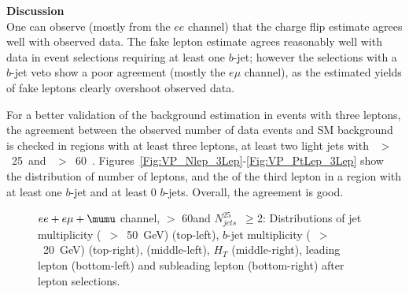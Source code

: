 \par{\bf Discussion\\}
One can observe (mostly from the $ee$ channel) that the charge flip estimate agrees well with observed data. 
The fake lepton estimate agrees reasonably well with data in event selections requiring at least one $b$-jet; 
however the selections with a $b$-jet veto show a poor agreement (mostly the $e\mu$ channel), as the estimated yields of fake leptons clearly overshoot observed data. 

For a better validation of the background estimation in events with three leptons, the agreement between the observed number of data events and SM background is checked in regions with at least three leptons, at least two light jets with \pt~$>$~25~\GeV and \met~$>$~60~\GeV. Figures~\ref{Fig:VP_Nlep_3Lep}-\ref{Fig:VP_PtLep_3Lep} show the distribution of number of leptons, and the \pt of the third lepton in a region with at least one $b$-jet and at least 0 $b$-jets. Overall, the agreement is good. 


\begin{figure}[h!]
\centering
{}
\caption{$ee+e\mu+\mumu$ channel, \met $>$ 60\GeV and $N_{jets}^{25}$~$\ge$2: Distributions of  jet multiplicity (\pt~$>$~50~GeV) (top-left), $b$-jet multiplicity (\pt~$>$~20~GeV) (top-right), \mt (middle-left), $H_T$ (middle-right), leading lepton \pt (bottom-left) and subleading lepton \pt (bottom-right) after lepton selections.}
\label{Fig:VP_allCh_bIncl_Njets_and_other}
\end{figure} 

\FloatBarrier


